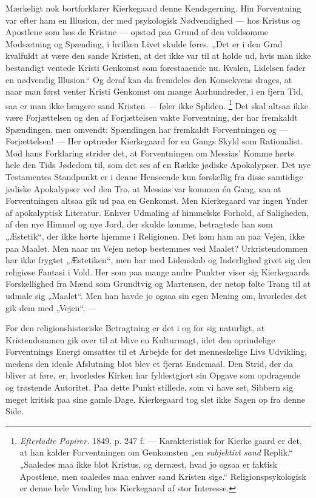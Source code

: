 \documentclass[12pt,a4paper,openany]{book}
\newcommand{\opage}[1]{\marginnote{\footnotesize\textit{[#1]}}}
\begin{document}
Mærkeligt nok bortforklarer Kierkegaard denne Kendsgerning. Hin Forventning var
efter ham en Illusion, der med psykologisk Nødvendighed --- hos Kristus og
Apostlene som hos de Kristne --- opstod paa Grund af den voldsomme Modsætning
og Spænding, i hvilken Livet skulde føres. „Det er i den Grad kvalfuldt at være
den sande Kristen, at det ikke var til at holde ud, hvis man ikke bestandigt
ventede Kristi Genkomst som forestaaende nu. Kvalen, Lidelsen føder en
nødvendig Illusion.“ Og deraf kan da fremdeles den Konsekvens drages, at naar
man først venter Kristi Genkomst om mange Aarhundreder, i en fjern Tid, saa er
man ikke længere sand Kristen --- føler ikke Spliden.%
\footnote[2]{\textit{Efterladte Papirer.} 1849. p. 247 f. --- Karakteristisk
for Kierke gaard er det, at han kalder Forventningen om Genkomsten „en
\textit{subjektivt sand} Replik.“ „Saaledes maa ikke blot Kristus, og dernæst,
hvad jo ogsaa er faktisk Apostlene, men saaledes maa enhver sand Kristen sige.“
Religionspsykologisk er denne hele Vending hos Kierkegaard af stor Interesse.}
Det skal altsaa
\setcounter{footnote}{0}%
\opage{173}ikke være Forjættelsen og den af Forjættelsen vakte Forventning, der
har fremkaldt Spændingen, men omvendt: Spændingen har fremkaldt Forventningen
og --- Forjættelsen! --- Her optræder Kierkegaard for en Gangs Skyld som
Rationalist. Mod hans Forklaring strider det, at Forventningen om Messias'
Komme hørte hele den Tids Jødedom til, som det ses af en Række jødiske
Apokalypser. Det nye Testamentes Standpunkt er i denne Henseende kun forskellig
fra disse samtidige jødiske Apokalypser ved den Tro, at Messias var kommen én
Gang, saa at Forventningen altsaa gik ud paa en Genkomst. Men Kierkegaard var
ingen Ynder af apokalyptisk Literatur. Enhver Udmaling af himmelske Forhold, af
Saligheden, af den nye Himmel og nye Jord, der skulde komme, betragtede han som
„Æstetik“, der ikke hørte hjemme i Religionen. Det kom ham an paa Vejen, ikke
paa Maalet. Men naar nu Vejen netop bestemmes ved Maalet? Urkristendommen har
ikke frygtet „Æstetiken“, men har med Lidenskab og Inderlighed givet sig den
religiøse Fantasi i Vold. Her som paa mange andre Punkter viser sig
Kierkegaards Forskellighed fra Mænd som Grundtvig og Martensen, der netop følte
Trang til at udmale sig „Maalet“. Men han havde jo ogsaa sin egen Mening om,
hvorledes det gik dem med „Vejen“. ---

For den religionshistoriske Betragtning er det i og for sig naturligt, at
Kristendommen gik over til at blive en Kulturmagt, idet den oprindelige
Forventnings Energi omsattes til et Arbejde for det menneskelige Livs
Udvikling, medens den ideale Afslutning blot blev et fjernt Endemaal. Den
Strid, der da bliver at føre, er, hvorledes Kirken har fyldestgjort sin Opgave
som opdragende og trøstende Autoritet. Paa dette Punkt stillede, som vi have
set, Sibbern sig meget kritisk paa sine gamle Dage. Kierkegaard tog slet ikke
Sagen op fra denne Side.
\end{document}
